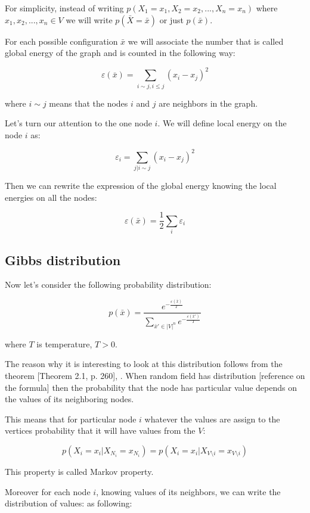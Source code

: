 \documentclass[12pt]{report}
\begin{document}
For simplicity, instead of writing $p(X_1 = x_1, X_2 = x_2, ...,  X_n = x_n)$ where $x_1, x_2, ..., x_n \in V$ we will write $p(\bar{X} = \bar{x})$ or just $p(\bar{x})$.

For each possible configuration $\bar{x}$ we will associate the number that is called global energy of the graph and is counted in the following way:

$$ \varepsilon (\bar{x}) =  \sum\limits_{i \sim j, i \leq j} (x_i - x_j)^2  $$


where $i \sim j$ means that the nodes $i$ and $j$ are neighbors in the graph.

Let's turn our attention to the one node $i$. We will define local energy on the node $i$ as:

$$ \varepsilon_i = \sum\limits_{j | i \sim j}  (x_i - x_j)^2 $$  

Then we can rewrite the expression of the global energy knowing the local energies on all the nodes:

$$ \varepsilon (\bar{x}) = \frac{1}{2}\sum_i \varepsilon_i$$


\subsection{Gibbs distribution}

Now let's consider the following probability distribution:

\begin{equation} \label{eq:gibbsdistr}
p(\bar{x}) = \frac{ e^{-\frac{ \varepsilon (\bar{x})}{T}} }{ \sum\limits_{\bar{x}'\in |V|^n} e^{-\frac{\varepsilon(\bar{x}')}{T}}} 
\end{equation}

where $T$ is temperature, $T > 0$.


The reason why it is interesting to look at this distribution follows from the theorem [Theorem 2.1, p. 260], \cite{bremaud2013markov}. When random field has distribution [reference on the formula] then the probability that the node has particular value depends on the values of its neighboring nodes.

This means that for particular node $i$ whatever the values are assign to the vertices  probability that it will have values from the $V$:

$$ p(X_i = x_i | X_{N_i} = x_{N_i}) = p(X_i = x_i | X_{V \setminus i} = x_{V\setminus i}) $$

This property is called Markov property.

Moreover for each node $i$, knowing values of its neighbors, we can write the distribution of values: as following:
\end{document}
